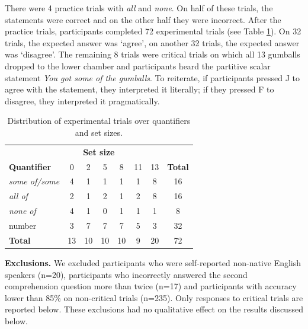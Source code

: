 \documentclass[10pt,letterpaper]{article}
\begin{document}
There were 4 practice trials with \textit{all} and \textit{none}. On half of these trials, the statements were correct and on the other half they were incorrect. After the practice trials, participants completed 72 experimental trials (see Table \ref{tab:stimuli}). On 32   trials, the expected answer was `agree', on another 32 trials, the expected answer was `disagree'. The remaining 8 trials were  critical trials on which all 13 gumballs dropped to the lower chamber and participants heard the partitive scalar statement \emph{You got some of the gumballs}. To reiterate, if participants pressed J to agree with the statement, they interpreted it literally; if they pressed F to disagree, they interpreted it pragmatically.


  \begin{table}
      \begin{tabular}{lccccccc}
      \midrule
      \multicolumn{8}{c}{\textbf{Set size}} \\
      \textbf{Quantifier} & 0 & 2 & 5 & 8 & 11 & 13 & \multicolumn{1}{l}{\textbf{Total}} \\
      \midrule
      \textit{some of/some} & 4 & 1 & 1 & 1 & 1 & 8 & 16 \\
      \textit{all of} & 2 & 1 & 2 & 1 & 2 & 8 & 16 \\
      \textit{none of} & 4 & 1 & 0 & 1 & 1 & 1 & 8 \\
      number & 3 & 7 & 7 & 7 & 5 & 3 & 32 \\
      \bottomrule
      \textbf{Total} & 13 & 10 & 10 & 10 & 9 & 20 & 72
      \end{tabular}
    \caption{Distribution of experimental trials over quantifiers and set sizes. \label{tab:stimuli}}
  \end{table}
  
  
\noindent \textbf{Exclusions.} We excluded participants who were self-reported non-native English speakers (n=20), participants who incorrectly answered the second comprehension question more than twice (n=17) and participants with accuracy lower than 85\% on non-critical trials (n=235). Only responses to critical trials are reported below. These exclusions had no qualitative effect on the results discussed below.

 
\end{document}
